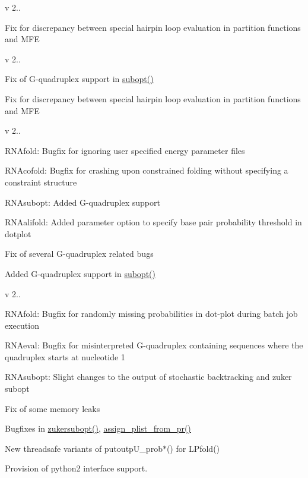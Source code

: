 v 2..
\begin{DoxyItemize}
\item Fix for discrepancy between special hairpin loop evaluation in partition functions and M\+FE
\end{DoxyItemize}

v 2..
\begin{DoxyItemize}
\item Fix of G-\/quadruplex support in \mbox{\hyperlink{group__subopt__wuchty_ga700f662506a233e42dd7fda74fafd40e}{subopt()}}
\item Fix for discrepancy between special hairpin loop evaluation in partition functions and M\+FE
\end{DoxyItemize}

v 2..
\begin{DoxyItemize}
\item R\+N\+Afold\+: Bugfix for ignoring user specified energy parameter files
\item R\+N\+Acofold\+: Bugfix for crashing upon constrained folding without specifying a constraint structure
\item R\+N\+Asubopt\+: Added G-\/quadruplex support
\item R\+N\+Aalifold\+: Added parameter option to specify base pair probability threshold in dotplot
\item Fix of several G-\/quadruplex related bugs
\item Added G-\/quadruplex support in \mbox{\hyperlink{group__subopt__wuchty_ga700f662506a233e42dd7fda74fafd40e}{subopt()}}
\end{DoxyItemize}

v 2..
\begin{DoxyItemize}
\item R\+N\+Afold\+: Bugfix for randomly missing probabilities in dot-\/plot during batch job execution
\item R\+N\+Aeval\+: Bugfix for misinterpreted G-\/quadruplex containing sequences where the quadruplex starts at nucleotide 1
\item R\+N\+Asubopt\+: Slight changes to the output of stochastic backtracking and zuker subopt
\item Fix of some memory leaks
\item Bugfixes in \mbox{\hyperlink{group__subopt__zuker_ga0d5104e3ecf119d8eabd40aa5fe47f90}{zukersubopt()}}, \mbox{\hyperlink{group__pf__fold_ga1cc05aaa9b0e7df2d3887e98321c2030}{assign\+\_\+plist\+\_\+from\+\_\+pr()}}
\item New threadsafe variants of putoutp\+U\+\_\+prob$\ast$() for L\+Pfold()
\item Provision of python2 interface support.
\end{DoxyItemize}

